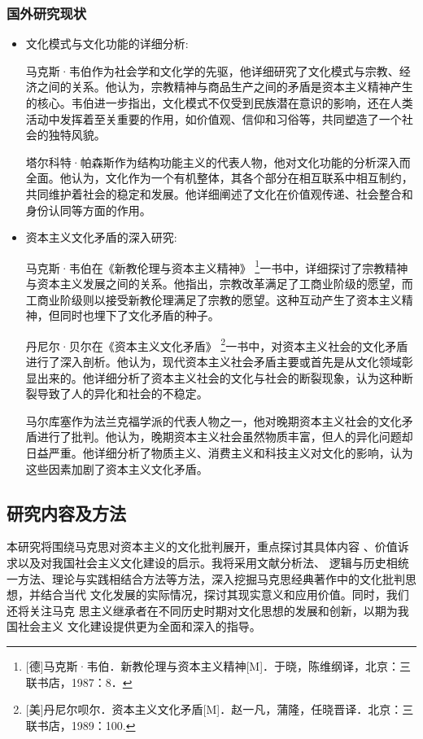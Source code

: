 \documentclass[a4paper]{ctexart}
\begin{document}
\subsubsection{国外研究现状}

\begin{itemize}
    \item {\heiti 文化模式与文化功能的详细分析:}
    
    \qquad 马克斯·韦伯作为社会学和文化学的先驱，他详细研究了文化模式与宗教、经济之间的关系。他认为，宗教精神与商品生产之间的矛盾是资本主义精神产生的核心。韦伯进一步指出，文化模式不仅受到民族潜在意识的影响，还在人类活动中发挥着至关重要的作用，如价值观、信仰和习俗等，共同塑造了一个社会的独特风貌。
    
    \qquad 塔尔科特·帕森斯作为结构功能主义的代表人物，他对文化功能的分析深入而全面。他认为，文化作为一个有机整体，其各个部分在相互联系中相互制约，共同维护着社会的稳定和发展。他详细阐述了文化在价值观传递、社会整合和身份认同等方面的作用。
    \item {\heiti 资本主义文化矛盾的深入研究:}
    
    \qquad 马克斯·韦伯在《新教伦理与资本主义精神》
    \footnote{[德]马克斯·韦伯．新教伦理与资本主义精神[M]．于晓，陈维纲译，北京：三联书店，1987：8．
    }一书中，详细探讨了宗教精神与资本主义发展之间的关系。他指出，宗教改革满足了工商业阶级的愿望，而工商业阶级则以接受新教伦理满足了宗教的愿望。这种互动产生了资本主义精神，但同时也埋下了文化矛盾的种子。
    
    \qquad 丹尼尔·贝尔在《资本主义文化矛盾》
    \footnote{[美]丹尼尔呗尔．资本主义文化矛盾[M]．赵一凡，蒲隆，任晓晋译．北京：三联书店，1989：100.
    }一书中，对资本主义社会的文化矛盾进行了深入剖析。他认为，现代资本主义社会矛盾主要或首先是从文化领域彰显出来的。他详细分析了资本主义社会的文化与社会的断裂现象，认为这种断裂导致了人的异化和社会的不稳定。
    
    \qquad 马尔库塞作为法兰克福学派的代表人物之一，他对晚期资本主义社会的文化矛盾进行了批判。他认为，晚期资本主义社会虽然物质丰富，但人的异化问题却日益严重。他详细分析了物质主义、消费主义和科技主义对文化的影响，认为这些因素加剧了资本主义文化矛盾。
    
\end{itemize}

\subsection{研究内容及方法}
本研究将围绕马克思对资本主义的文化批判展开，重点探讨其具体内容
、价值诉求以及对我国社会主义文化建设的启示。我将采用文献分析法、
逻辑与历史相统一方法、理论与实践相结合方法等方法，深入挖掘马克思经典著作中的文化批判思想，并结合当代
文化发展的实际情况，探讨其现实意义和应用价值。同时，我们还将关注马克
思主义继承者在不同历史时期对文化思想的发展和创新，以期为我国社会主义
文化建设提供更为全面和深入的指导。
\end{document}
